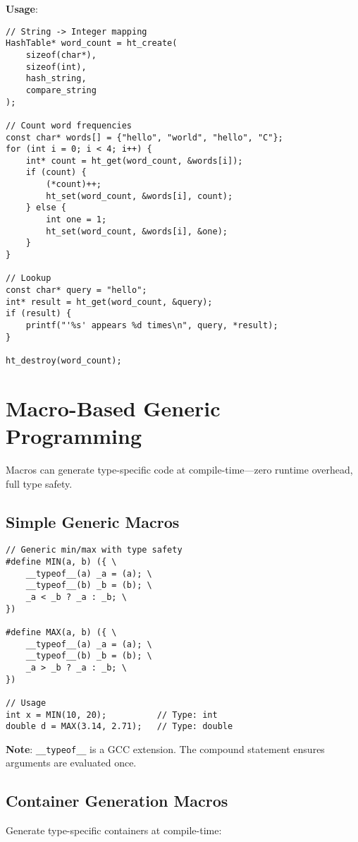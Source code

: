 \textbf{Usage}:

\begin{lstlisting}
// String -> Integer mapping
HashTable* word_count = ht_create(
    sizeof(char*),
    sizeof(int),
    hash_string,
    compare_string
);

// Count word frequencies
const char* words[] = {"hello", "world", "hello", "C"};
for (int i = 0; i < 4; i++) {
    int* count = ht_get(word_count, &words[i]);
    if (count) {
        (*count)++;
        ht_set(word_count, &words[i], count);
    } else {
        int one = 1;
        ht_set(word_count, &words[i], &one);
    }
}

// Lookup
const char* query = "hello";
int* result = ht_get(word_count, &query);
if (result) {
    printf("'%s' appears %d times\n", query, *result);
}

ht_destroy(word_count);
\end{lstlisting}

\section{Macro-Based Generic Programming}

Macros can generate type-specific code at compile-time—zero runtime overhead, full type safety.

\subsection{Simple Generic Macros}

\begin{lstlisting}
// Generic min/max with type safety
#define MIN(a, b) ({ \
    __typeof__(a) _a = (a); \
    __typeof__(b) _b = (b); \
    _a < _b ? _a : _b; \
})

#define MAX(a, b) ({ \
    __typeof__(a) _a = (a); \
    __typeof__(b) _b = (b); \
    _a > _b ? _a : _b; \
})

// Usage
int x = MIN(10, 20);          // Type: int
double d = MAX(3.14, 2.71);   // Type: double
\end{lstlisting}

\textbf{Note}: \texttt{\_\_typeof\_\_} is a GCC extension. The compound statement ensures arguments are evaluated once.

\subsection{Container Generation Macros}

Generate type-specific containers at compile-time:

